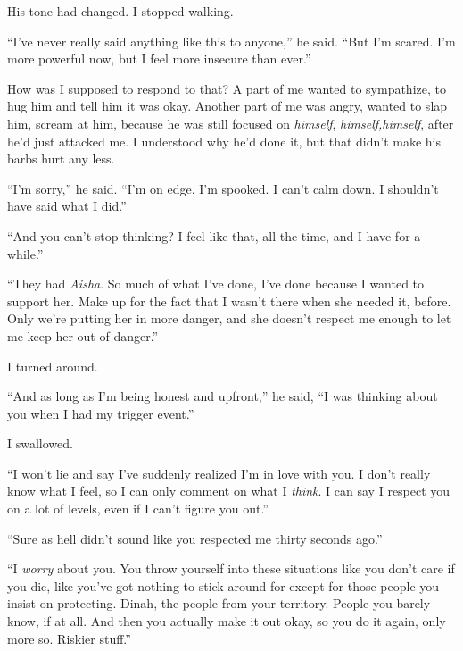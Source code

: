 His tone had changed.  I stopped walking.



``I've never really said anything like this to anyone,'' he said.  ``But I'm scared.  I'm more powerful now, but I feel more insecure than ever.''



How was I supposed to respond to that?  A part of me wanted to sympathize, to hug him and tell him it was okay.  Another part of me was angry, wanted to slap him, scream at him, because he was still focused on \emph{himself}, \emph{himself,}\emph{himself}, after he'd just attacked me.  I understood why he'd done it, but that didn't make his barbs hurt any less.



``I'm sorry,'' he said.  ``I'm on edge.  I'm spooked.  I can't calm down.  I shouldn't have said what I did.''



``And you can't stop thinking?  I feel like that, all the time, and I have for a while.''



``They had \emph{Aisha}.  So much of what I've done, I've done because I wanted to support her.  Make up for the fact that I wasn't there when she needed it, before.  Only we're putting her in more danger, and she doesn't respect me enough to let me keep her out of danger.''



I turned around.



``And as long as I'm being honest and upfront,'' he said, ``I was thinking about you when I had my trigger event.''



I swallowed.



``I won't lie and say I've suddenly realized I'm in love with you.  I don't really know what I feel, so I can only comment on what I \emph{think}.  I can say I respect you on a lot of levels, even if I can't figure you out.''



``Sure as hell didn't sound like you respected me thirty seconds ago.''



``I \emph{worry} about you.  You throw yourself into these situations like you don't care if you die, like you've got nothing to stick around for except for those people you insist on protecting.  Dinah, the people from your territory.  People you barely know, if at all.  And then you actually make it out okay, so you do it again, only more so.  Riskier stuff.''



